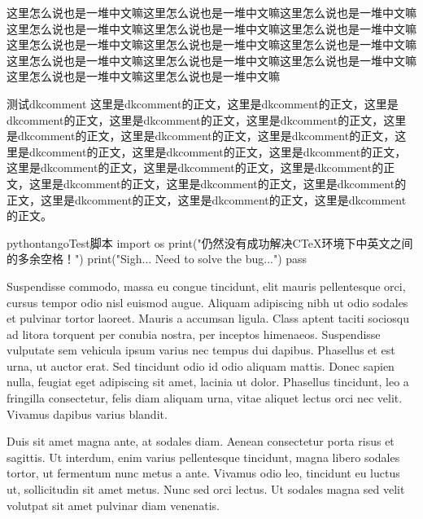 \makelettertitle

\begin{cvletter}

这里怎么说也是一堆中文嘛这里怎么说也是一堆中文嘛这里怎么说也是一堆中文嘛这里怎么说也是一堆中文嘛这里怎么说也是一堆中文嘛这里怎么说也是一堆中文嘛这里怎么说也是一堆中文嘛这里怎么说也是一堆中文嘛这里怎么说也是一堆中文嘛这里怎么说也是一堆中文嘛这里怎么说也是一堆中文嘛这里怎么说也是一堆中文嘛这里怎么说也是一堆中文嘛这里怎么说也是一堆中文嘛

\begin{dkcomment}{测试dkcomment}{\faTree}
这里是dkcomment的正文，这里是dkcomment的正文，这里是dkcomment的正文，这里是dkcomment的正文，这里是dkcomment的正文，这里是dkcomment的正文，这里是dkcomment的正文，这里是dkcomment的正文，这里是dkcomment的正文，这里是dkcomment的正文，这里是dkcomment的正文，这里是dkcomment的正文，这里是dkcomment的正文，这里是dkcomment的正文，这里是dkcomment的正文，这里是dkcomment的正文，这里是dkcomment的正文，这里是dkcomment的正文，这里是dkcomment的正文，这里是dkcomment的正文。
\end{dkcomment}

\begin{dkcodeh}{python}{tango}{Test脚本}
import os
print("仍然没有成功解决CTeX环境下中英文之间的多余空格！")
print("Sigh... Need to solve the bug...")
pass
\end{dkcodeh}

Suspendisse commodo, massa eu congue tincidunt, elit mauris pellentesque orci, cursus tempor odio nisl euismod augue. Aliquam adipiscing nibh ut odio sodales et pulvinar tortor laoreet. Mauris a accumsan ligula. Class aptent taciti sociosqu ad litora torquent per conubia nostra, per inceptos himenaeos. Suspendisse vulputate sem vehicula ipsum varius nec tempus dui dapibus. Phasellus et est urna, ut auctor erat. Sed tincidunt odio id odio aliquam mattis. Donec sapien nulla, feugiat eget adipiscing sit amet, lacinia ut dolor. Phasellus tincidunt, leo a fringilla consectetur, felis diam aliquam urna, vitae aliquet lectus orci nec velit. Vivamus dapibus varius blandit.

Duis sit amet magna ante, at sodales diam. Aenean consectetur porta risus et sagittis. Ut interdum, enim varius pellentesque tincidunt, magna libero sodales tortor, ut fermentum nunc metus a ante. Vivamus odio leo, tincidunt eu luctus ut, sollicitudin sit amet metus. Nunc sed orci lectus. Ut sodales magna sed velit volutpat sit amet pulvinar diam venenatis.

\end{cvletter}


\makeletterclosing
